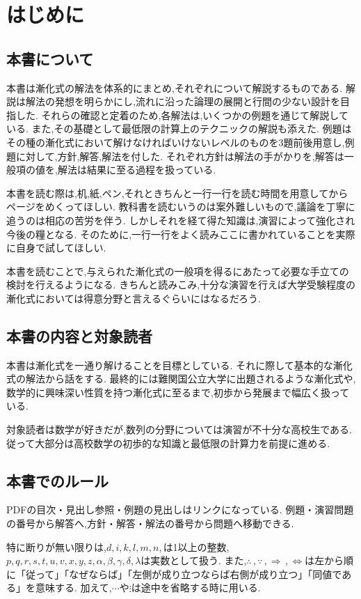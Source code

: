 
\section{はじめに}\label{節：はじめに}
  \subsection{本書について}\label{節：本書について}
    本書は漸化式の解法を体系的にまとめ,それぞれについて解説するものである.
    解説は解法の発想を明らかにし,流れに沿った論理の展開と行間の少ない設計を目指した.
    それらの確認と定着のため,各解法は,いくつかの例題を通じて解説している.
    また,その基礎として最低限の計算上のテクニックの解説も添えた.
    例題はその種の漸化式において解けなければいけないレベルのものを3題前後用意し,例題に対して,方針,解答,解法を付した.
    それぞれ方針は解法の手がかりを,解答は一般項の値を,解法は結果に至る過程を扱っている.

    本書を読む際は,机,紙,ペン,それときちんと一行一行を読む時間を用意してからページをめくってほしい.
    教科書を読むいうのは案外難しいもので,議論を丁寧に追うのは相応の苦労を伴う.
    しかしそれを経て得た知識は,演習によって強化され今後の糧となる.
    そのために,一行一行をよく読みここに書かれていることを実際に自身で試してほしい.

    本書を読むことで,与えられた漸化式の一般項を得るにあたって必要な手立ての検討を行えるようになる.
    きちんと読みこみ,十分な演習を行えば大学受験程度の漸化式においては得意分野と言えるぐらいにはなるだろう.     

  \subsection{本書の内容と対象読者}\label{節：本書の内容と対象読者}
    本書は漸化式を一通り解けることを目標としている.
    それに際して基本的な漸化式の解法から話をする.
    最終的には難関国公立大学に出題されるような漸化式や,数学的に興味深い性質を持つ漸化式に至るまで,初歩から発展まで幅広く扱っている.
    
    対象読者は数学が好きだが,数列の分野については演習が不十分な高校生である.
    従って大部分は高校数学の初歩的な知識と最低限の計算力を前提に進める.

  \subsection{本書でのルール}\label{節：本書でのルール}
    PDFの目次・見出し参照・例題の見出しはリンクになっている.
    例題・演習問題の番号から解答へ,方針・解答・解法の番号から問題へ移動できる.

    特に断りが無い限りは,$d,i,k,l,m,n,$は1以上の整数,$p,q,r,s,t,u,v,x,y,z,\alpha,\beta,\gamma,\delta,\lambda$は実数として扱う.
    また,$\therefore\,,\because\,,\Rightarrow\,,\Leftrightarrow$は左から順に「従って」「なぜならば」「左側が成り立つならば右側が成り立つ」「同値である」を意味する.
    加えて,$\cdots$や$\vdots$は途中を省略する時に用いる.
